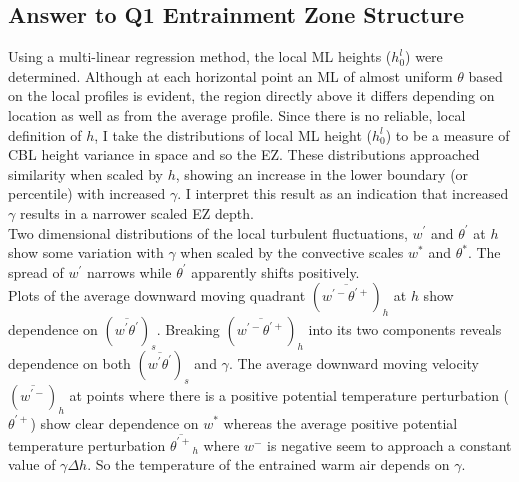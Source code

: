 \subsection{Answer to Q1 Entrainment Zone Structure}

Using a multi-linear regression method, the local \acs{ML} heights ($h^{l}_{0}$) 
were determined.  Although at each horizontal point an \acs{ML} of almost uniform $\theta$ based on the local profiles is evident, the region directly above it differs depending on location as well as from the average profile. 
Since there is no reliable, local definition of $h$, 
I take the distributions of local \acs{ML} height ($h^{l}_{0}$) to be a measure of \acs{CBL} height variance in space and so the \acs{EZ}.
 These distributions approached similarity when scaled by $h$, showing an increase in the lower 
boundary (or percentile) with increased $\gamma$.  I interpret this result as an indication that increased $\gamma$ results in a narrower scaled \acs{EZ} depth.\\

Two dimensional distributions of the local turbulent fluctuations, $w^{'}$ and $\theta^{'}$ at $h$ show some variation with $\gamma$ when scaled by the convective scales $w^{*}$ and $\theta^{*}$.  The spread of $w^{'}$ narrows while $\theta^{'}$ apparently shifts positively.\\

Plots of the average downward moving quadrant $(\overline{w^{'-}\theta^{'+}})_{h}$ at $h$ show dependence on $(\overline{w^{'}\theta^{'}})_{s}$. Breaking $(\overline{w^{'-}\theta^{'+}})_{h}$ into its two components reveals dependence on both $(\overline{w^{'}\theta^{'}})_{s}$ and $\gamma$. The average downward moving velocity $(\overline{w^{'-}})_{h}$ at points where there is a positive potential temperature perturbation ($\theta^{'+}$) show clear dependence on $w^{*}$ whereas the average positive potential temperature perturbation $\overline{\theta^{'+}}_{h}$ where $w^{-}$ is negative seem to approach a constant value of $\gamma \Delta h$. So the temperature of the entrained warm air depends on $\gamma$.

\clearpage



